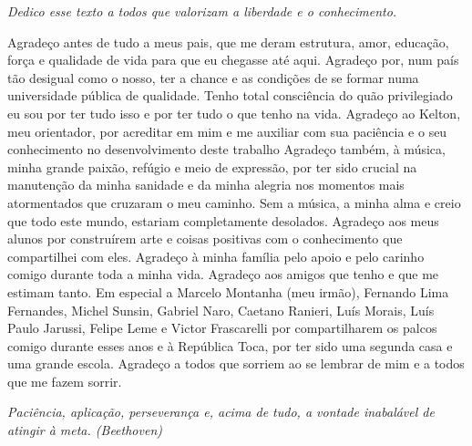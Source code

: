\documentclass[
	12pt,				%
	openright,			%
	oneside,			%
	a4paper,			%
	brazil				%
	]{abntex2}
\begin{document}
\begin{dedicatoria}
   \vspace*{\fill}
   \begin{flushright}
   		\textit{Dedico esse texto a todos que valorizam a liberdade e o conhecimento.}
   \end{flushright}
\end{dedicatoria}

\begin{agradecimentos}
Agradeço antes de tudo a meus pais, que me deram estrutura, amor, educação,
força e qualidade de vida para que eu chegasse até aqui. Agradeço por, num país
tão desigual como o nosso, ter a chance e as condições de se formar numa
universidade pública de qualidade. Tenho total consciência do quão privilegiado
eu sou por ter tudo isso e por ter tudo o que tenho na vida. Agradeço ao Kelton,
meu orientador, por acreditar em mim e me auxiliar com sua paciência e o seu
conhecimento no desenvolvimento deste trabalho Agradeço também, à música, minha
grande paixão, refúgio e meio de expressão, por ter sido crucial na manutenção
da minha sanidade e da minha alegria nos momentos mais atormentados que cruzaram
o meu caminho. Sem a música, a minha alma e creio que todo este mundo, estariam
completamente desolados. Agradeço aos meus alunos por construírem arte e coisas
positivas com o conhecimento que compartilhei com eles. Agradeço à minha família
pelo apoio e pelo carinho comigo durante toda a minha vida. Agradeço aos amigos
que tenho e que me estimam tanto. Em especial a Marcelo Montanha (meu irmão),
Fernando Lima Fernandes, Michel Sunsin, Gabriel Naro, Caetano Ranieri, Luís
Morais, Luís Paulo Jarussi, Felipe Leme e Victor Frascarelli por compartilharem
os palcos comigo durante esses anos e à República Toca, por ter sido uma segunda
casa e uma grande escola. Agradeço a todos que sorriem ao se
lembrar de mim e a todos que me fazem sorrir. \end{agradecimentos}

\begin{epigrafe}
    \vspace*{\fill}
	\begin{flushright}
		\textit{Paciência, aplicação, perseverança e, acima de tudo, a vontade inabalável de atingir à meta. (Beethoven)}
	\end{flushright}
\end{epigrafe}

\end{document}
